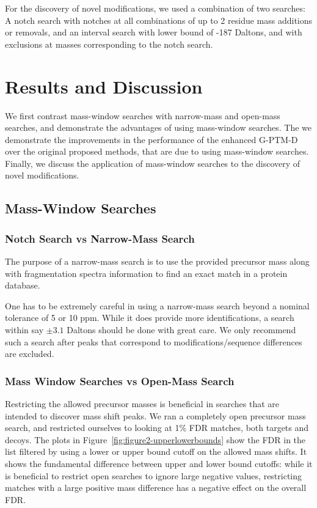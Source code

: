 \documentclass[journal=jprobs,manuscript=article]{achemso}
\begin{document}
For the discovery of novel modifications, we used a combination of two searches: A notch search with notches at all combinations of up to 2 residue mass additions or removals, and an interval search with lower bound of -187 Daltons, and with exclusions at masses corresponding to the notch search.

\section{Results and Discussion}

We first contrast mass-window searches with narrow-mass and open-mass searches, and demonstrate the advantages of using mass-window searches.
The we demonstrate the improvements in the performance of the enhanced G-PTM-D over the original proposed methods, that are due to using mass-window searches.
Finally, we discuss the application of mass-window searches to the discovery of novel modifications.
 
\subsection{Mass-Window Searches}

\subsubsection{Notch Search vs Narrow-Mass Search}

The purpose of a narrow-mass search is to use the provided precursor mass along with fragmentation spectra information to find an exact match in a protein database.

One has to be extremely careful in using a narrow-mass search beyond a nominal tolerance of 5 or 10 ppm. 
While it does provide more identifications, a search within say $\pm 3.1$ Daltons should be done with great care.
We only recommend such a search after peaks that correspond to modifications/sequence differences are excluded.

\subsubsection{Mass Window Searches vs Open-Mass Search}

Restricting the allowed precursor masses is beneficial in searches that are intended to discover mass shift peaks.
We ran a completely open precursor mass search, and restricted ourselves to looking at 1\% FDR matches, both targets and decoys.
The plots in Figure~\ref{fig:figure2-upperlowerbounds} show the FDR in the list filtered by using a lower or upper bound cutoff on the allowed mass shifts.
It shows the fundamental difference between upper and lower bound cutoffs: while it is beneficial to restrict open searches to ignore large negative values, restricting matches with a large positive mass difference has a negative effect on the overall FDR.
\end{document}
